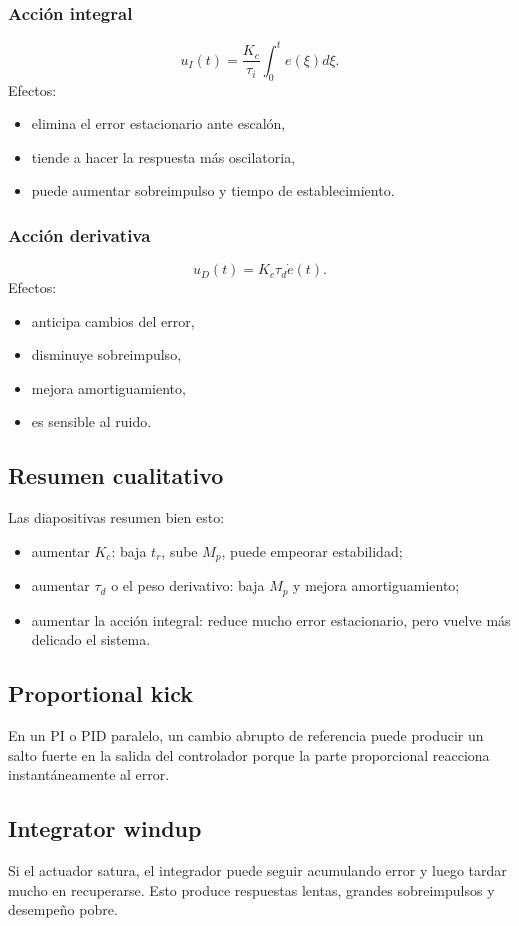 \documentclass[11pt]{article}
\begin{document}
\subsubsection{Acci\'on integral}
\[
u_I(t)=\frac{K_c}{\tau_i}\int_0^t e(\xi)d\xi.
\]
Efectos:
\begin{itemize}
\item elimina el error estacionario ante escal\'on,
\item tiende a hacer la respuesta m\'as oscilatoria,
\item puede aumentar sobreimpulso y tiempo de establecimiento.
\end{itemize}

\subsubsection{Acci\'on derivativa}
\[
u_D(t)=K_c\tau_d \dot{e}(t).
\]
Efectos:
\begin{itemize}
\item anticipa cambios del error,
\item disminuye sobreimpulso,
\item mejora amortiguamiento,
\item es sensible al ruido.
\end{itemize}

\subsection{Resumen cualitativo}
Las diapositivas resumen bien esto:
\begin{itemize}
\item aumentar $K_c$: baja $t_r$, sube $M_p$, puede empeorar estabilidad;
\item aumentar $\tau_d$ o el peso derivativo: baja $M_p$ y mejora amortiguamiento;
\item aumentar la acci\'on integral: reduce mucho error estacionario, pero vuelve m\'as delicado el sistema.
\end{itemize}

\subsection{Proportional kick}
En un PI o PID paralelo, un cambio abrupto de referencia puede producir un salto fuerte en la salida del controlador porque la parte proporcional reacciona instant\'aneamente al error.

\subsection{Integrator windup}
Si el actuador satura, el integrador puede seguir acumulando error y luego tardar mucho en recuperarse. Esto produce respuestas lentas, grandes sobreimpulsos y desempe\~no pobre.
\end{document}
